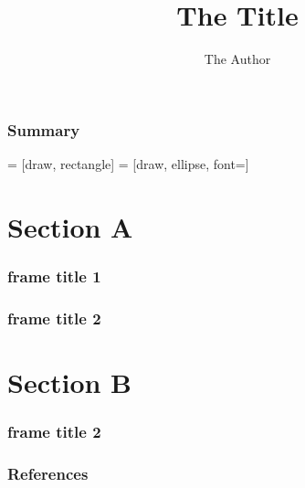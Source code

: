 \documentclass{beamer}
\title{The Title}
\author{The Author}
\institute{}
\date{}
\begin{document}
\frame{\titlepage}


\begin{frame}
    \frametitle{Summary}

     = [draw, rectangle]
     = [draw, ellipse, font=\tiny]


\end{frame}


\section{Section A}

\begin{frame}
\frametitle{frame title 1}

\begin{definition}[definition 1]
\end{definition}

\end{frame}


\begin{frame}
\frametitle{frame title 2}

\end{frame}


\section{Section B}

\begin{frame}
\frametitle{frame title 2}

\end{frame}


\begin{frame}[allowframebreaks]
    \frametitle{References}
    
    \tiny
\end{frame}
\end{document}
